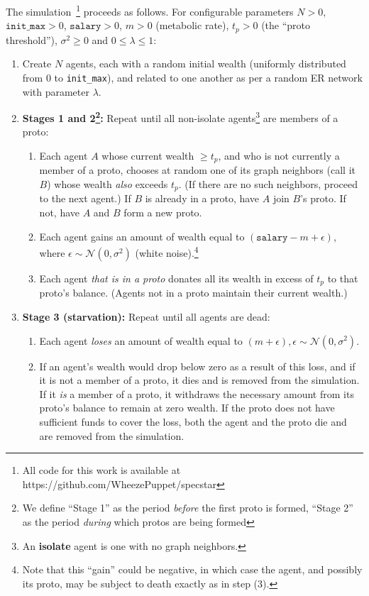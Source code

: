 The simulation~\footnote{All code for this work is available at https://github.com/WheezePuppet/specstar} proceeds as follows. For configurable parameters
$N > 0$,
$\texttt{init\_max} > 0$,
$\texttt{salary} > 0$,
$m > 0$ (metabolic rate),
$t_p > 0$ (the ``proto threshold''),
$\sigma^2 \ge 0$ and
$0 \le \lambda \le 1$:

\begin{enumerate}
\itemsep.1em
\item Create $N$ agents, each with a random initial wealth (uniformly distributed from 0 to \texttt{init\_max}), and related to one another as per a random ER network with parameter $\lambda$.
\item \textbf{Stages 1 and 2\footnote{We define ``Stage 1'' as the period \textit{before} the first proto is formed, ``Stage 2'' as the period \textit{during} which protos are being formed}:} Repeat until all non-isolate agents\footnote{An \textbf{isolate} agent is one with no graph neighbors.} are members of a proto:
    \begin{enumerate}
    \itemsep.1em
    \item Each agent $A$ whose current wealth $\ge t_p$, and who is not currently a member of a proto, chooses at random one of its graph neighbors (call it $B$) whose wealth \textit{also} exceeds $t_p$. (If there are no such neighbors, proceed to the next agent.) If $B$ is already in a proto, have $A$ join $B$'s proto. If not, have $A$ and $B$ form a new proto.
    \item Each agent gains an amount of wealth equal to $(\texttt{salary} - m + \epsilon)$, where $\epsilon \sim \mathcal{N}(0,\sigma^2)$ (white noise).\footnote{Note that this ``gain'' could be negative, in which case the agent, and possibly its proto, may be subject to death exactly as in step (3).}
    \item Each agent \textit{that is in a proto} donates all its wealth in excess of $t_p$ to that proto's balance. (Agents not in a proto maintain their current wealth.)
    \end{enumerate}
    \item \textbf{Stage 3 (starvation):} Repeat until all agents are dead:
        \begin{enumerate}
        \itemsep.1em
        \item Each agent \textit{loses} an amount of wealth equal to $(m + \epsilon), \epsilon \sim \mathcal{N}(0,\sigma^2)$.
        \item If an agent's wealth would drop below zero as a result of this loss, and if it is not a member of a proto, it dies and is removed from the simulation. If it \textit{is} a member of a proto, it withdraws the necessary amount from its proto's balance to remain at zero wealth. If the proto does not have sufficient funds to cover the loss, both the agent and the proto die and are removed from the simulation.
        \end{enumerate}
\end{enumerate}

